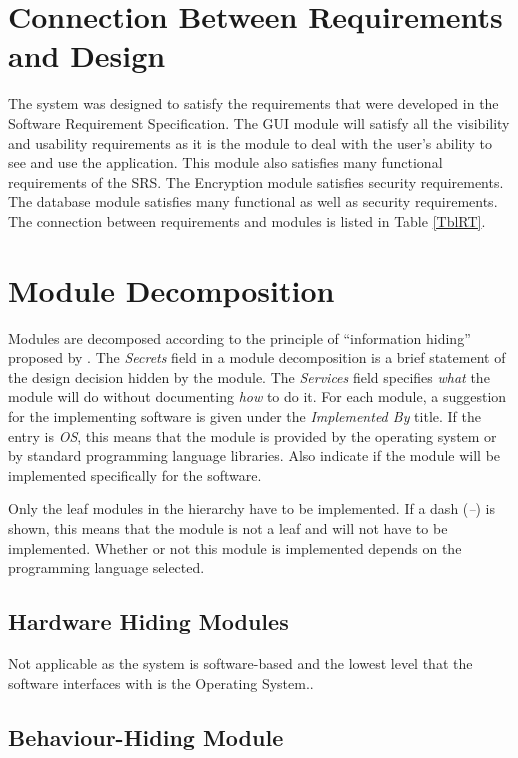 \documentclass[12pt, titlepage]{article}
\begin{document}
\section{Connection Between Requirements and Design} \label{SecConnection}

The system was designed to satisfy the requirements that were developed in the Software Requirement Specification. The GUI module will satisfy all the visibility and usability requirements as it is the module to deal with the user’s ability to see and use the application. This module also satisfies many functional requirements of the SRS. The Encryption module satisfies security requirements. The database module satisfies many functional as well as security requirements. The connection between requirements and modules is listed in Table \ref{TblRT}.

\section{Module Decomposition} \label{SecMD}

Modules are decomposed according to the principle of ``information hiding''
proposed by \citet{ParnasEtAl1984}. The \emph{Secrets} field in a module
decomposition is a brief statement of the design decision hidden by the
module. The \emph{Services} field specifies \emph{what} the module will do
without documenting \emph{how} to do it. For each module, a suggestion for the
implementing software is given under the \emph{Implemented By} title. If the
entry is \emph{OS}, this means that the module is provided by the operating
system or by standard programming language libraries.  Also indicate if the
module will be implemented specifically for the software.

Only the leaf modules in the
hierarchy have to be implemented. If a dash (\emph{--}) is shown, this means
that the module is not a leaf and will not have to be implemented. Whether or
not this module is implemented depends on the programming language
selected.

\subsection{Hardware Hiding Modules}

Not applicable as the system is software-based and the lowest level that the software interfaces with is the Operating System..

\subsection{Behaviour-Hiding Module}
\end{document}
